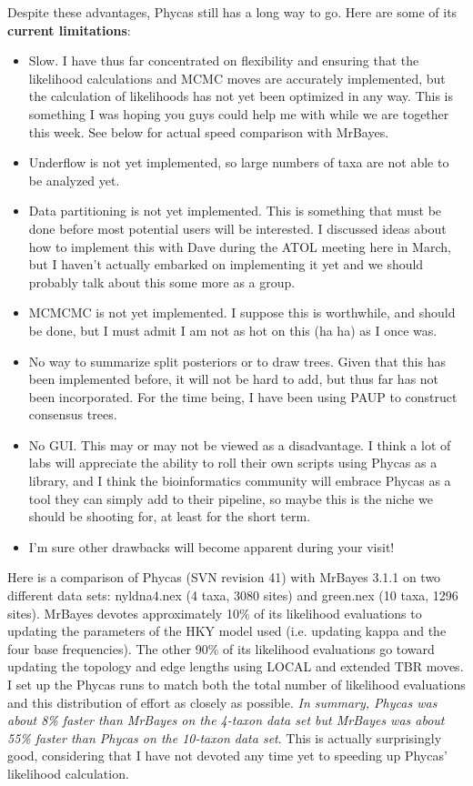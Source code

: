\documentclass[10pt]{article}
\begin{document}
Despite these advantages, Phycas still has a long way to go. Here are some of its {\bfseries current limitations}:
\begin{itemize}
\item Slow. I have thus far concentrated on flexibility and ensuring that the likelihood calculations and MCMC moves are accurately implemented, but the calculation of likelihoods has not yet been optimized in any way. This is something I was hoping you guys could help me with while we are together this week. See below for actual speed comparison with MrBayes.
\item Underflow is not yet implemented, so large numbers of taxa are not able to be analyzed yet.
\item Data partitioning is not yet implemented. This is something that must be done before most potential users will be interested. I discussed ideas about how to implement this with Dave during the ATOL meeting here in March, but I haven't actually embarked on implementing it yet and we should probably talk about this some more as a group.
\item MCMCMC is not yet implemented. I suppose this is worthwhile, and should be done, but I must admit I am not as hot on this (ha ha) as I once was.
\item No way to summarize split posteriors or to draw trees. Given that this has been implemented before, it will not be hard to add, but thus far has not been incorporated. For the time being, I have been using PAUP to construct consensus trees.
\item No GUI. This may or may not be viewed as a disadvantage. I think a lot of labs will appreciate the ability to roll their own scripts using Phycas as a library, and I think the bioinformatics community will embrace Phycas as a tool they can simply add to their pipeline, so maybe this is the niche we should be shooting for, at least for the short term.
\item I'm sure other drawbacks will become apparent during your visit!
\end{itemize}

Here is a comparison of Phycas (SVN revision 41) with MrBayes 3.1.1 on two different data sets: nyldna4.nex (4 taxa, 3080 sites) and green.nex (10 taxa, 1296 sites). MrBayes devotes approximately 10\% of its likelihood evaluations to updating the parameters of the HKY model used (i.e. updating kappa and the four base frequencies). The other 90\% of its likelihood evaluations go toward updating the topology and edge lengths using LOCAL and extended TBR moves. I set up the Phycas runs to match both the total number of likelihood evaluations and this distribution of effort as closely as possible. {\em In summary, Phycas was about 8\% faster than MrBayes on the 4-taxon data set but MrBayes was about 55\% faster than Phycas on the 10-taxon data set}. This is actually surprisingly good, considering that I have not devoted any time yet to speeding up Phycas' likelihood calculation.  
\end{document}
